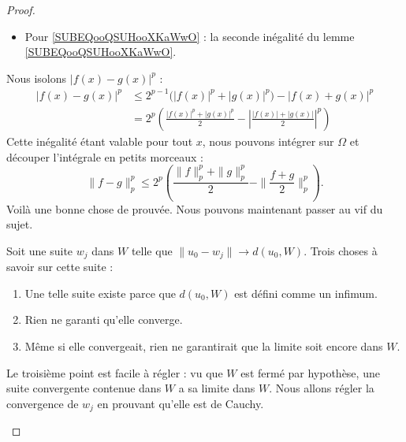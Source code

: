 \begin{proof}
\begin{subproof}
\begin{itemize}
				\item Pour \eqref{SUBEQooQSUHooXKaWwO} : la seconde inégalité du lemme \ref{SUBEQooQSUHooXKaWwO}.
			\end{itemize}
			Nous isolons \( | f(x)-g(x) |^p\) :
			\begin{subequations}
				\begin{align}
					| f(x)-g(x) |^p & \leq 2^{p-1}\big( | f(x) |^p+| g(x) |^p \big)-| f(x)+g(x) |^p                                       \\
					                & =2^p\left( \frac{ | f(x) |^p+| g(x) |^p }{2}-\left| \frac{ | f(x) |+| g(x) | }{2} \right|^p \right)
				\end{align}
			\end{subequations}
			Cette inégalité étant valable pour tout \( x\), nous pouvons intégrer sur \( \Omega\) et découper l'intégrale en petits morceaux :
			\begin{equation}        \label{EQooVNHSooPXjFNC}
				\| f-g \|^p_p\leq 2^p\left( \frac{ \| f \|_p^p+\| g \|_p^p }{2}- \| \frac{ f+g }{2} \|_p^p \right).
			\end{equation}
			Voilà une bonne chose de prouvée. Nous pouvons maintenant passer au vif du sujet.

			Soit une suite \( w_j\) dans \( W\) telle que \( \| u_0-w_j \|\to d(u_0,W)\). Trois choses à savoir sur cette suite :
			\begin{enumerate}
				\item
				      Une telle suite existe parce que \( d(u_0,W)\) est défini comme un infimum.
				\item
				      Rien ne garanti qu'elle converge.
				\item
				      Même si elle convergeait, rien ne garantirait que la limite soit encore dans \( W\).
			\end{enumerate}
			Le troisième point est facile à régler : vu que \( W\) est fermé par hypothèse, une suite convergente contenue dans \( W\) a sa limite dans \( W\). Nous allons régler la convergence de \( w_j\) en prouvant qu'elle est de Cauchy.


\end{subproof}
\end{proof}
